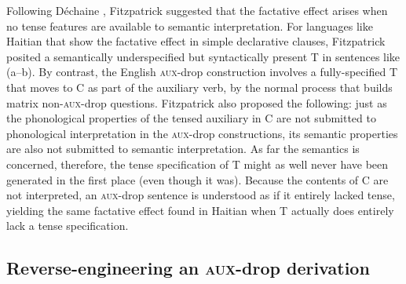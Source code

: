 \documentclass[output=paper]{langscibook}
\begin{document}
\noindent Following Déchaine \citeyearpar{Dechaine1991}, Fitzpatrick suggested that the factative effect arises when no tense features are available to semantic interpretation. For languages like Haitian that show the factative effect in simple declarative clauses, Fitzpatrick posited a semantically underspecified but syntactically present T in sentences like (a--b). By contrast, the English \textsc{aux-}drop construction involves a fully-specified T that moves to C as part of the auxiliary verb, by the normal process that builds matrix non-\textsc{aux}-drop questions. Fitzpatrick also proposed the following: just as the phonological properties of the tensed auxiliary in C are not submitted to phonological interpretation in the \textsc{aux-}drop constructions, its semantic properties are also not submitted to semantic interpretation. As far the semantics is concerned, therefore, the tense specification of T might as well never have been generated in the first place (even though it was). Because the contents of C are not interpreted, an \textsc{aux}-drop sentence is understood as if it entirely lacked tense, yielding the same factative effect found in Haitian when T actually does entirely lack a tense specification.


\subsection{Reverse-engineering an \textsc{aux-}drop derivation}\label{subsec:Reverse-engineering-an-aux-drop}\largerpage
\end{document}
